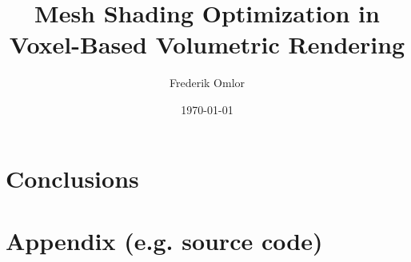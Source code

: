 \documentclass[ a4paper,
                oneside,
                toc=bibliography,
                toc=listof
                ]{scrbook}
\author{Frederik Omlor}
\title{Mesh Shading Optimization in Voxel-Based Volumetric Rendering}
\date{\today}
\begin{document}
 
    \frontmatter
    \makeISWtitle

	\cleardoublepage
	\setcounter{page}{1} %
    \declarationOfOriginality

    

    
    
    \cleardoublepage
    \tableofcontents

    \mainmatter
    
    \nocite{*}


    
    
    
    
    
    
    \chapter{Conclusions}

    
    \cleardoublepage
    \printbibliography
    
     \cleardoublepage
    
    
    \cleardoublepage
    \listoffigures
    
    \cleardoublepage
    \listoftables
    
    
    
    \appendix
    \chapter{Appendix (e.g. source code)}
\end{document}
